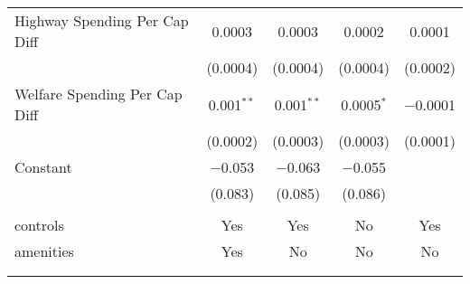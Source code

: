 \begin{table}[!htbp]
\begin{tabular}{@{\extracolsep{5pt}}lcccc}
  Highway Spending Per Cap Diff & 0.0003 & 0.0003 & 0.0002 & 0.0001 \\ 
  & (0.0004) & (0.0004) & (0.0004) & (0.0002) \\ 
  Welfare Spending Per Cap Diff & 0.001$^{**}$ & 0.001$^{**}$ & 0.0005$^{*}$ & $-$0.0001 \\ 
  & (0.0002) & (0.0003) & (0.0003) & (0.0001) \\ 
  Constant & $-$0.053 & $-$0.063 & $-$0.055 &  \\ 
  & (0.083) & (0.085) & (0.086) &  \\ 
 \hline \\[-1.8ex] 
controls & Yes & Yes & No & Yes \\ 
amenities & Yes & No & No & No \\ 
\hline \\[-1.8ex] 
\hline 
\hline \\[-1.8ex] 
\end{tabular} 
\end{table} 
